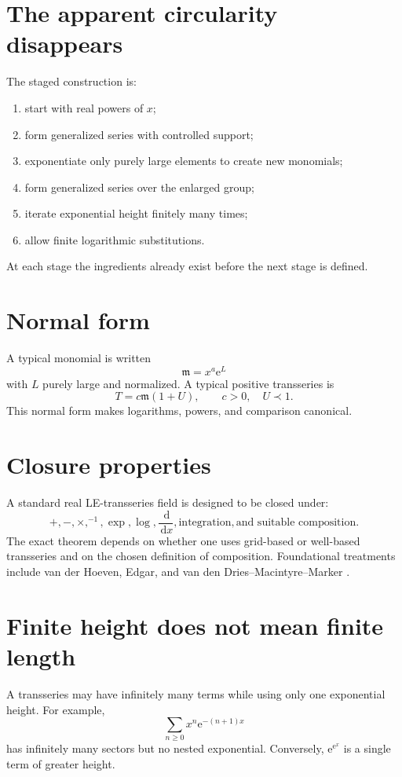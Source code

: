 \documentclass[11pt,oneside,openany]{book}
\newcommand{\e}{\mathrm{e}}
\newcommand{\dd}{\,\mathrm{d}}
\newcommand{\mon}{\mathfrak{m}}
\theoremstyle{plain}
\theoremstyle{definition}
\theoremstyle{remark}
\begin{document}
\section{The apparent circularity disappears}
The staged construction is:
\begin{enumerate}
  \item start with real powers of $x$;
  \item form generalized series with controlled support;
  \item exponentiate only purely large elements to create new monomials;
  \item form generalized series over the enlarged group;
  \item iterate exponential height finitely many times;
  \item allow finite logarithmic substitutions.
\end{enumerate}
At each stage the ingredients already exist before the next stage is defined.

\section{Normal form}
A typical monomial is written
\[
  \mon=x^a\e^L
\]
with $L$ purely large and normalized. A typical positive transseries is
\[
  T=c\mon(1+U),
  \qquad c>0,
  \quad U\prec1.
\]
This normal form makes logarithms, powers, and comparison canonical.

\section{Closure properties}
A standard real LE-transseries field is designed to be closed under:
\[
  +,-,\times,^{-1},\exp,\log,
  \frac{\dd}{\dd x},
  \text{integration},
  \text{and suitable composition}.
\]
The exact theorem depends on whether one uses grid-based or well-based transseries and on the chosen definition of composition. Foundational treatments include van der Hoeven, Edgar, and van den Dries--Macintyre--Marker \cite{DMM2001,Edgar2010,vdH2006}.

\section{Finite height does not mean finite length}
A transseries may have infinitely many terms while using only one exponential height. For example,
\[
  \sum_{n\ge0}x^n\e^{-(n+1)x}
\]
has infinitely many sectors but no nested exponential. Conversely, $\e^{\e^x}$ is a single term of greater height.
\end{document}
